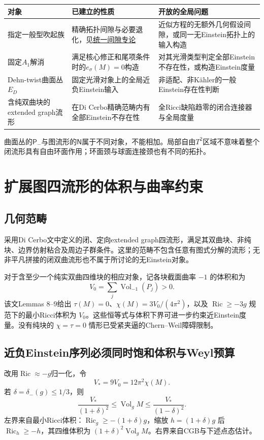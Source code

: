 \documentclass[UTF8,a4paper,11pt,fontset=fandol]{ctexart}
\numberwithin{equation}{section}
\theoremstyle{definition}
\newcommand{\Ric}{\operatorname{Ric}}
\newcommand{\Vol}{\operatorname{Vol}}
\begin{document}
\begin{longtable}{L{.22\textwidth}L{.34\textwidth}L{.35\textwidth}}
\toprule 对象 & 已建立的性质 & 开放的全局问题\\\midrule\endhead
指定一般型吹起族 & 精确拓扑间隙与必要退化，见\href{20260916_uniform_gap.tex}{统一间隙专论} & 近似方程的无额外几何假设间隙，或同一无Einstein拓扑上的输入构造\\
固定$A_1$解消 & 满足核心修正和尾项条件时的$e_\sigma(M)=0$构造 & 对其光滑类型判定全部Einstein不存在性，或构造Einstein度量\\
Dehn-twist曲面丛 $E_D$ & 固定光滑对象上的全局近负Einstein输入 & 非适配、非K\"ahler的一般Einstein存在性判断\\
含纯双曲块的extended graph流形 & 在Di Cerbo精确范畴内有全部Einstein不存在性 & 全Ricci缺陷趋零的闭合连接器与全局度量\\\bottomrule
\end{longtable}
曲面丛的$\mathsf P_-$与图流形的$\mathsf N$属于不同对象，不能相加。局部自由$T^2$区域不意味着整个闭流形具有自由环面作用；环面颈与球面连接颈也有不同的拓扑。

\section{扩展图四流形的体积与曲率约束}
\subsection{几何范畴}
采用Di Cerbo文中定义的闭、定向extended graph四流形，满足其双曲块、非纯块、边界仿射粘合及周边子群条件\cite{DiCerbo}。这里的范畴不包含任意有图式分解的流形；无非平凡拼接的闭双曲流形也不属于所讨论的无Einstein对象。

对于含至少一个纯实双曲四维块的相应对象，记各块截面曲率 $-1$ 的体积和为
\[
V_0=\sum_j\Vol_{-1}(P_j)>0.
\]
该文Lemmas 8--9给出 $\tau(M)=0$、$\chi(M)=3V_0/(4\pi^2)$，以及 $\Ric\ge-3g$ 规范下的最小Ricci体积为 $V_0$。这些恒等式与体积下界可进一步约束近Einstein度量。没有纯块的 $\chi=\tau=0$ 情形已受紧夹逼的Chern--Weil障碍限制。

\subsection{近负Einstein序列必须同时饱和体积与Weyl预算}
改用$\Ric\approx-g$归一化，令
\[
V_*=9V_0=12\pi^2\chi(M).
\]
若 $\delta=\delta_-(g)\le1/3$，则
\begin{equation}\label{eq:graphvol}
\boxed{\frac{V_*}{(1+\delta)^2}\le\Vol_gM
\le\frac{V_*}{(1-\delta)^2}.}
\end{equation}
左界来自最小Ricci体积：$\Ric_g\ge-(1+\delta)g$，缩放 $h=(1+\delta)g$ 后 $\Ric_h\ge-h$，其四维体积为 $(1+\delta)^2\Vol_gM$。右界来自CGB与下述点态估计。
\end{document}
